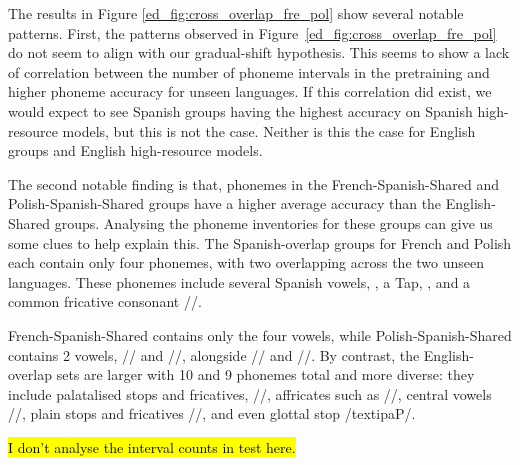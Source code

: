 The results in Figure \ref{ed_fig:cross_overlap_fre_pol} show several notable patterns. First, the patterns observed in Figure~\ref{ed_fig:cross_overlap_fre_pol} do not seem to align with our gradual-shift hypothesis. This seems to show a lack of correlation between the number of phoneme intervals in the pretraining and higher phoneme accuracy for unseen languages. If this correlation did exist, we would expect to see Spanish groups having the highest accuracy on Spanish high-resource models, but this is not the case. Neither is this the case for English groups and English high-resource models.  

The second notable finding is that, phonemes in the French-Spanish-Shared and Polish-Spanish-Shared groups have a higher average accuracy than the English-Shared groups. Analysing the phoneme inventories for these groups can give us some clues to help explain this. The Spanish-overlap groups for French and Polish each contain only four phonemes, with two overlapping across the two unseen languages. These phonemes include several Spanish vowels, , a Tap, , and a common fricative consonant //. 

French-Spanish-Shared contains only the four vowels, while Polish-Spanish-Shared contains 2 vowels, // and //, alongside // and //. By contrast, the English-overlap sets are larger with 10 and 9 phonemes total and more diverse: they include palatalised stops and fricatives, //, affricates such as //, central vowels //, plain stops and fricatives //, and even glottal stop /textipa{P}/. 

\hl{I don't analyse the interval counts in test here.}

